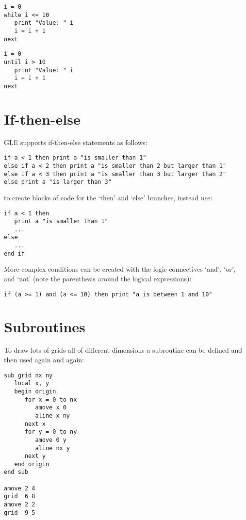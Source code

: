 \preglecode{}
\begin{Verbatim}
i = 0
while i <= 10
   print "Value: " i
   i = i + 1
next
\end{Verbatim}
\postglecode{}

\preglecode{}
\begin{Verbatim}
i = 0
until i > 10
   print "Value: " i
   i = i + 1
next
\end{Verbatim}
\postglecode{}

\section{If-then-else}

GLE supports if-then-else statements as follows:

\preglecode{}
\begin{Verbatim}
if a < 1 then print a "is smaller than 1"
else if a < 2 then print a "is smaller than 2 but larger than 1"
else if a < 3 then print a "is smaller than 3 but larger than 2"
else print a "is larger than 3"
\end{Verbatim}
\postglecode{}

\noindent{}to create blocks of code for the `then' and `else' branches, instead use:

\preglecode{}
\begin{Verbatim}
if a < 1 then
   print a "is smaller than 1"
   ...
else
   ...
end if
\end{Verbatim}
\postglecode{}

More complex conditions can be created with the logic connectives `{\sf and}', `{\sf or}', and `{\sf not}' (note the parenthesis around the logical expressions):

\preglecode{}
\begin{Verbatim}
if (a >= 1) and (a <= 10) then print "a is between 1 and 10"
\end{Verbatim}
\postglecode{}

\section{Subroutines}

To draw lots of grids all of different dimensions a subroutine can
be defined and then used again and again:

\preglecode{}
\begin{Verbatim}
sub grid nx ny 
   local x, y
   begin origin
      for x = 0 to nx
         amove x 0 
         aline x ny 
      next x
      for y = 0 to ny
         amove 0 y 
         aline nx y 
      next y 
   end origin
end sub
     
amove 2 4
grid  6 8
amove 2 2
grid  9 5
\end{Verbatim}
\postglecode{}

